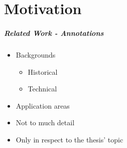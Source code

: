 \chapter{Motivation}
\label{motivation}

%


\paragraph{Related Work - Annotations}

\begin{itemize}
	\item Backgrounds
	\begin{itemize}
		\item Historical
		\item Technical
	\end{itemize}
	\item Application areas
	\item Not to much detail
	\item Only in respect to the thesis' topic
\end{itemize}



